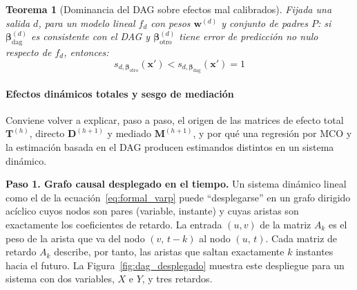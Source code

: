 \documentclass[12pt]{report} %
\newtheorem{theorem}{Teorema}
\begin{document}
\begin{theorem}[Dominancia del DAG sobre efectos mal calibrados]
    \label{thm:dag_dominates}
    Fijada una salida $d$, para un modelo lineal $f_d$ con pesos $\mathbf{w}^{(d)}$ y conjunto de padres $P$: si $\boldsymbol{\beta}^{(d)}_{\text{dag}}$ es consistente con el DAG y $\boldsymbol{\beta}^{(d)}_{\text{otro}}$ tiene error de predicción no nulo respecto de $f_d$, entonces:
    $$s_{d,\boldsymbol{\beta}_{\text{otro}}}(\mathbf{x}') < s_{d,\boldsymbol{\beta}_{\text{dag}}}(\mathbf{x}') = 1$$
\end{theorem}

\paragraph{Efectos dinámicos totales y sesgo de mediación}

Conviene volver a explicar, paso a paso, el origen de las matrices de efecto total $\mathbf{T}^{(h)}$, directo $\mathbf{D}^{(h+1)}$ y mediado $\mathbf{M}^{(h+1)}$, y por qué una regresión por  MCO y la estimación basada en el DAG producen estimandos distintos en un sistema dinámico.

\textbf{Paso 1. Grafo causal desplegado en el tiempo.} Un sistema dinámico lineal como el de la ecuación~\eqref{eq:formal_varp} puede ``desplegarse'' en un grafo dirigido acíclico cuyos nodos son pares (variable, instante) y cuyas aristas son exactamente los coeficientes de retardo. La entrada $(u, v)$ de la matriz $A_k$ es el peso de la arista que va del nodo $(v,\, t-k)$ al nodo $(u,\, t)$. Cada matriz de retardo $A_k$ describe, por tanto, las aristas que saltan exactamente $k$ instantes hacia el futuro. La Figura~\ref{fig:dag_desplegado} muestra este despliegue para un sistema con dos variables, $X$ e $Y$, y tres retardos.
\end{document}
